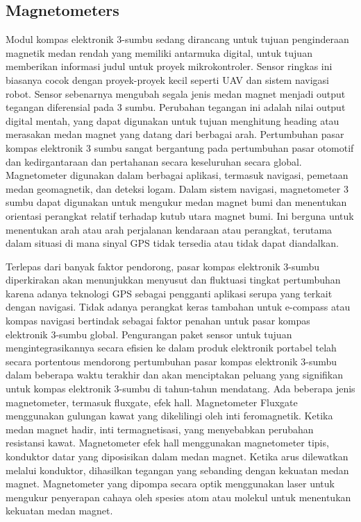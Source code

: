 \subsection{Magnetometers}

Modul kompas elektronik 3-sumbu sedang dirancang untuk tujuan penginderaan magnetik medan rendah yang memiliki antarmuka digital, untuk tujuan memberikan informasi judul untuk proyek 
mikrokontroler. Sensor ringkas ini biasanya cocok dengan proyek-proyek kecil seperti UAV dan sistem navigasi robot. Sensor sebenarnya mengubah segala jenis medan magnet menjadi output 
tegangan diferensial pada 3 sumbu. Perubahan tegangan ini adalah nilai output digital mentah, yang dapat digunakan untuk tujuan menghitung heading atau merasakan medan magnet yang datang 
dari berbagai arah. Pertumbuhan pasar kompas elektronik 3 sumbu sangat bergantung pada pertumbuhan pasar otomotif dan kedirgantaraan dan pertahanan secara keseluruhan secara global. 
Magnetometer digunakan dalam berbagai aplikasi, termasuk navigasi, pemetaan medan geomagnetik, dan deteksi logam. Dalam sistem navigasi, magnetometer 3 sumbu dapat digunakan untuk 
mengukur medan magnet bumi dan menentukan orientasi perangkat relatif terhadap kutub utara magnet bumi. Ini berguna untuk menentukan arah atau arah perjalanan kendaraan atau perangkat, 
terutama dalam situasi di mana sinyal GPS tidak tersedia atau tidak dapat diandalkan.

Terlepas dari banyak faktor pendorong, pasar kompas elektronik 3-sumbu diperkirakan akan menunjukkan menyusut dan fluktuasi tingkat pertumbuhan karena adanya teknologi GPS sebagai 
pengganti aplikasi serupa yang terkait dengan navigasi. Tidak adanya perangkat keras tambahan untuk e-compass atau kompas navigasi bertindak sebagai faktor penahan untuk pasar kompas 
elektronik 3-sumbu global. Pengurangan paket sensor untuk tujuan mengintegrasikannya secara efisien ke dalam produk elektronik portabel telah secara portentous mendorong pertumbuhan 
pasar kompas elektronik 3-sumbu dalam beberapa waktu terakhir dan akan menciptakan peluang yang signifikan untuk kompas elektronik 3-sumbu di tahun-tahun mendatang. Ada beberapa jenis 
magnetometer, termasuk fluxgate, efek hall. Magnetometer Fluxgate menggunakan gulungan kawat yang dikelilingi oleh inti feromagnetik. Ketika 
medan magnet hadir, inti termagnetisasi, yang menyebabkan perubahan resistansi kawat. Magnetometer efek hall menggunakan magnetometer tipis, konduktor datar yang diposisikan dalam medan 
magnet. Ketika arus dilewatkan melalui konduktor, dihasilkan tegangan yang sebanding dengan kekuatan medan magnet. Magnetometer yang dipompa secara optik menggunakan laser untuk mengukur 
penyerapan cahaya oleh spesies atom atau molekul untuk menentukan kekuatan medan magnet.


